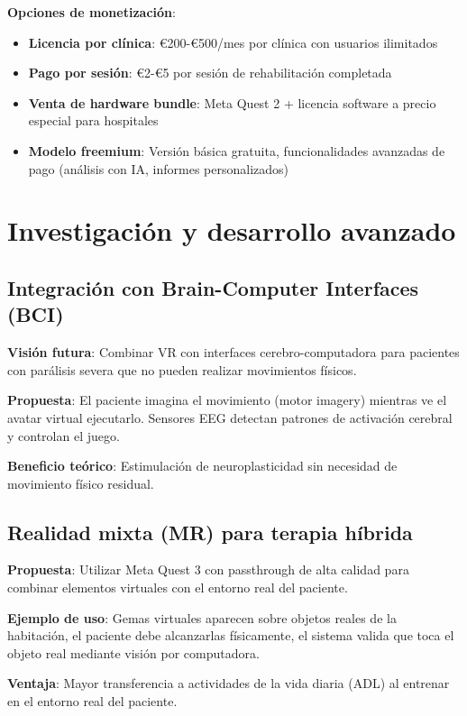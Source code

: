 \textbf{Opciones de monetización}:
\begin{itemize}
    \item \textbf{Licencia por clínica}: €200-€500/mes por clínica con usuarios ilimitados
    \item \textbf{Pago por sesión}: €2-€5 por sesión de rehabilitación completada
    \item \textbf{Venta de hardware bundle}: Meta Quest 2 + licencia software a precio especial para hospitales
    \item \textbf{Modelo freemium}: Versión básica gratuita, funcionalidades avanzadas de pago (análisis con IA, informes personalizados)
\end{itemize}

\section{Investigación y desarrollo avanzado}

\subsection{Integración con Brain-Computer Interfaces (BCI)}

\textbf{Visión futura}: Combinar VR con interfaces cerebro-computadora para pacientes con parálisis severa que no pueden realizar movimientos físicos.

\textbf{Propuesta}: El paciente imagina el movimiento (motor imagery) mientras ve el avatar virtual ejecutarlo. Sensores EEG detectan patrones de activación cerebral y controlan el juego.

\textbf{Beneficio teórico}: Estimulación de neuroplasticidad sin necesidad de movimiento físico residual.

\subsection{Realidad mixta (MR) para terapia híbrida}

\textbf{Propuesta}: Utilizar Meta Quest 3 con passthrough de alta calidad para combinar elementos virtuales con el entorno real del paciente.

\textbf{Ejemplo de uso}: Gemas virtuales aparecen sobre objetos reales de la habitación, el paciente debe alcanzarlas físicamente, el sistema valida que toca el objeto real mediante visión por computadora.

\textbf{Ventaja}: Mayor transferencia a actividades de la vida diaria (ADL) al entrenar en el entorno real del paciente.

